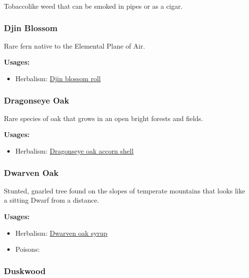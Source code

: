 Tobaccolike weed that can be smoked in pipes or as a cigar.

\subsubsection{Djin Blossom}
\label{Djin Blossom}

Rare fern native to the Elemental Plane of Air.

\vspace{5mm}

\textbf{Usages:}

\begin{itemize}[noitemsep]
\item[] Herbalism: \hyperref[Djin blossom roll]{Djin blossom roll}
\end{itemize}

\subsubsection{Dragonseye Oak}
\label{Dragonseye Oak}

Rare species of oak that grows in an open bright forests and fields.

\vspace{5mm}

\textbf{Usages:}

\begin{itemize}[noitemsep]
\item[] Herbalism: \hyperref[Dragonseye oak accorn shell]{Dragonseye oak accorn shell}
\end{itemize}

\subsubsection{Dwarven Oak}
\label{Dwarven Oak}

Stunted, gnarled tree found on the slopes of temperate mountains that looks like a sitting Dwarf from a distance.

\vspace{5mm}

\textbf{Usages:}

\begin{itemize}[noitemsep]
\item[] Herbalism: \hyperref[Dwarven oak syrup]{Dwarven oak syrup}
\item[] Poisons: \poison
\end{itemize}

\subsubsection{Duskwood}

